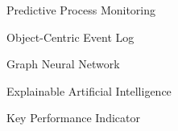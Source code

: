 \begin{abbreviations}
    \item[PPM] Predictive Process Monitoring
    \item[OCEL] Object-Centric Event Log
    \item[GNN] Graph Neural Network
    \item[XAI] Explainable Artificial Intelligence 
    \item[KPI] Key Performance Indicator
\end{abbreviations}

